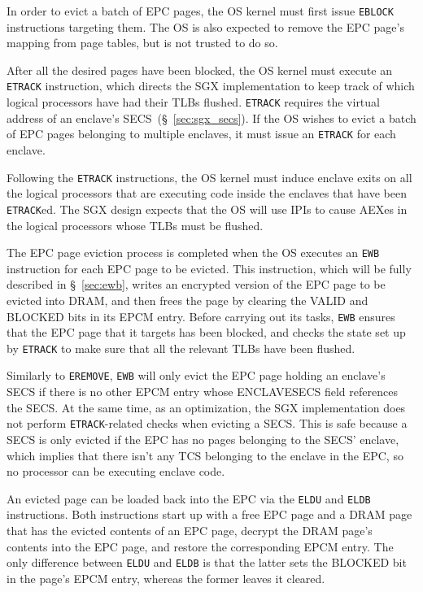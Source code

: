 
In order to evict a batch of EPC pages, the OS kernel must first issue
\texttt{EBLOCK} instructions targeting them. The OS is also expected to remove
the EPC page's mapping from page tables, but is not trusted to do so.

After all the desired pages have been blocked, the OS kernel must execute an
\texttt{ETRACK} instruction, which directs the SGX implementation to keep track
of which logical processors have had their TLBs flushed. \texttt{ETRACK}
requires the virtual address of an enclave's SECS~(\S~\ref{sec:sgx_secs}). If
the OS wishes to evict a batch of EPC pages belonging to multiple enclaves, it
must issue an \texttt{ETRACK} for each enclave.

Following the \texttt{ETRACK} instructions, the OS kernel must induce enclave
exits on all the logical processors that are executing code inside the enclaves
that have been \texttt{ETRACK}ed. The SGX design expects that the OS will use
IPIs to cause AEXes in the logical processors whose TLBs must be flushed.

The EPC page eviction process is completed when the OS executes an \texttt{EWB}
instruction for each EPC page to be evicted. This instruction, which will be
fully described in \S~\ref{sec:ewb}, writes an encrypted version of the EPC
page to be evicted into DRAM, and then frees the page by clearing the VALID and
BLOCKED bits in its EPCM entry. Before carrying out its tasks, \texttt{EWB}
ensures that the EPC page that it targets has been blocked, and checks the
state set up by \texttt{ETRACK} to make sure that all the relevant TLBs have
been flushed.

Similarly to \texttt{EREMOVE}, \texttt{EWB} will only evict the EPC page
holding an enclave's SECS if there is no other EPCM entry whose ENCLAVESECS
field references the SECS. At the same time, as an optimization, the SGX
implementation does not perform \texttt{ETRACK}-related checks when evicting a
SECS. This is safe because a SECS is only evicted if the EPC has no pages
belonging to the SECS' enclave, which implies that there isn't any TCS
belonging to the enclave in the EPC, so no processor can be executing enclave
code.

An evicted page can be loaded back into the EPC via the \texttt{ELDU} and
\texttt{ELDB} instructions. Both instructions start up with a free EPC page and
a DRAM page that has the evicted contents of an EPC page, decrypt the DRAM
page's contents into the EPC page, and restore the corresponding EPCM entry.
The only difference between \texttt{ELDU} and \texttt{ELDB} is that the latter
sets the BLOCKED bit in the page's EPCM entry, whereas the former leaves it
cleared.


